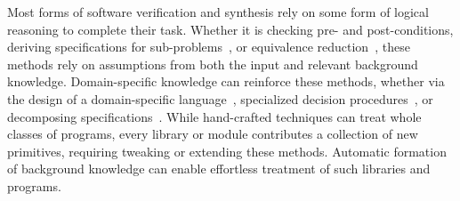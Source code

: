 \begin{comment}
Logical deduction is fundamental to automatic reasoning and, therefore, to software verification. 
A verification task is typically reduced to a proof obligation; after which, the obligation is dismissed by automatic reasoning techniques.
Most of these techniques rely on logical inference-rules to apply logical deduction, and attempt to construct a proof. As proof construction might fail,
state of the art verification tools [Dafny, Leon, Cvc4] support the input of lemmas which can then be applied using generic inference rules.
Supplying correct and suiting lemmas is time consuming, and requires low-level understanding of the verified code.

For many cases, automatic theorem provers discover auxiliary lemmas as part of the proof search.
Depending on the underlying logic and theory, support lemmas might be an essential part of any pro of for a given theorem.
Discovering lemmas during proof search can be resource expensive, as a lemma can be any valid formula, leading to infinite possibilities.

Two main discovery approaches exist, top down and bottom up.
In top down discovery [vampire, e prover, cvc4, acl2], the prover starts with a proof obligation, and heuristically guides the search using it; during the search it attempts to find and prove lemmas.
While existing provers are capable of intricate proofs, lemma discovery 
Common automatic theorem proving techniques are based on superposition calculus [Vampire, and a few more], machine learning and search [e prover, hammers], and SMT solvers [Cvc4 and friends]. All these tools require a proof obligation from which the search is guided. This is called top down proving, as the search starts from the obligation. While awsome, creating lemmas for Dafny and Leon and freinds will be manual.
A different approach, bottom up proving, relies on lemma discovery, and proves all lemmas that are found, expanding the underlying theory.
While less suited for theorem proving, as the goal does not guide the lemm search. it was shown to perform well in such tasks [hipspec]. It is definitly more suited for what we want to do.
\end{comment}

Most forms of software verification and synthesis rely on some form of logical reasoning to complete their task.
Whether it is checking pre- and post-conditions, deriving specifications for sub-problems~\cite{PLDI2015:Feser,POPL2016:Albarghouthi}, or equivalence reduction~\cite{VMCAI2019:Smith}, these methods rely on assumptions from both the input and relevant background knowledge.
Domain-specific knowledge can reinforce these methods, whether via the design of a domain-specific language~\cite{PLDI2001:Xiong,HPEC2000:Moura,CACM2018:Ragan-Kelley}, specialized decision procedures~\cite{TODAES2012:Milder}, or decomposing specifications~\cite{ACM2015:Polozov}.
While hand-crafted techniques can treat whole classes of programs, every library or module contributes a collection of new primitives, requiring tweaking or extending these methods.
Automatic formation of background knowledge can enable effortless treatment of such libraries and programs.

